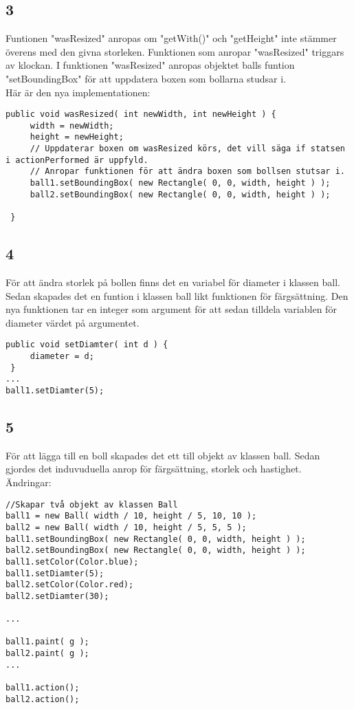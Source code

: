 \documentclass[hidelinks]{article}
\begin{document}
\subsection*{3}
Funtionen "wasResized" anropas om "getWith()" och "getHeight" inte stämmer överens med den givna storleken. Funktionen som anropar "wasResized" triggars av klockan. I funktionen "wasResized" anropas objektet balls funtion "setBoundingBox" för att uppdatera boxen som bollarna studsar i.
\\Här är den nya implementationen:
\begin{verbatim}
public void wasResized( int newWidth, int newHeight ) {
     width = newWidth;
     height = newHeight;
     // Uppdaterar boxen om wasResized körs, det vill säga if statsen i actionPerformed är uppfyld.
     // Anropar funktionen för att ändra boxen som bollsen stutsar i.
     ball1.setBoundingBox( new Rectangle( 0, 0, width, height ) );
     ball2.setBoundingBox( new Rectangle( 0, 0, width, height ) );
     
 }
 \end{verbatim}

\newpage
\subsection*{4}
För att ändra storlek på bollen finns det en variabel för diameter i klassen ball. Sedan skapades det en funtion i klassen ball likt funktionen för färgsättning. Den nya funktionen tar en integer som argument för att sedan tilldela variablen för diameter värdet på argumentet.
\begin{verbatim}
public void setDiamter( int d ) {
     diameter = d;
 }
...
ball1.setDiamter(5);
 \end{verbatim}

\subsection*{5}
För att lägga till en boll skapades det ett till objekt av klassen ball. Sedan gjordes det induvuduella anrop för färgsättning, storlek och hastighet. 
\\Ändringar:
\begin{verbatim}
//Skapar två objekt av klassen Ball
ball1 = new Ball( width / 10, height / 5, 10, 10 );
ball2 = new Ball( width / 10, height / 5, 5, 5 );
ball1.setBoundingBox( new Rectangle( 0, 0, width, height ) );
ball2.setBoundingBox( new Rectangle( 0, 0, width, height ) );
ball1.setColor(Color.blue);
ball1.setDiamter(5);
ball2.setColor(Color.red);
ball2.setDiamter(30);

...

ball1.paint( g );
ball2.paint( g );
...

ball1.action();
ball2.action();
\end{verbatim}
\end{document}
